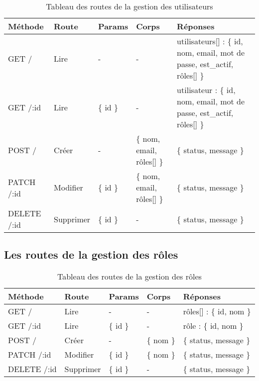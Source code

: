 \begin{table}[ht]
  \caption{Tableau des routes de la gestion des utilisateurs}
  \label{tab:routes-user}
  \begin{tabular}{|p{1.5cm}|p{1.5cm}|p{1cm}|p{2.5cm}|p{3.5cm}| }
    \hline
    Méthode & Route & Params & Corps & Réponses \\
    \hline
    GET / & Lire & - & - & utilisateurs[] :  \{ id, nom, email, mot de passe, est\_actif, r\^oles[] \} \\
    \hline
    GET /:id & Lire & \{ id \} & - & utilisateur : \{ id, nom, email, mot de passe, est\_actif, r\^oles[] \} \\
    \hline
    POST / & Créer & - & \{ nom, email, r\^oles[] \} & \{ status, message \} \\
    \hline
    PATCH /:id & Modifier & \{ id \} & \{ nom, email, r\^oles[] \} & \{ status, message \} \\
    \hline
    DELETE /:id & Supprimer & \{ id \} & - & \{ status, message \} \\
    \hline
  \end{tabular}
\end{table}
\pagebreak

\subsection{Les routes de la gestion des rôles}\label{subsec:routes-role}

\begin{table}[ht]
  \caption{Tableau des routes de la gestion des rôles}
  \label{tab:routes-role}
  \begin{tabular}{|p{1.5cm}|p{1.5cm}|p{1cm}|p{2.5cm}|p{3.5cm}| }
    \hline
    Méthode & Route & Params & Corps & Réponses \\
    \hline
    GET / & Lire & - & - & rôles[] :  \{ id, nom \} \\
    \hline
    GET /:id & Lire & \{ id \} & - & rôle : \{ id, nom \} \\
    \hline
    POST / & Créer & - & \{ nom \} & \{ status, message \} \\
    \hline
    PATCH /:id & Modifier & \{ id \} & \{ nom \} & \{ status, message \} \\
    \hline
    DELETE /:id & Supprimer & \{ id \} & - & \{ status, message \} \\
    \hline
  \end{tabular}
\end{table}